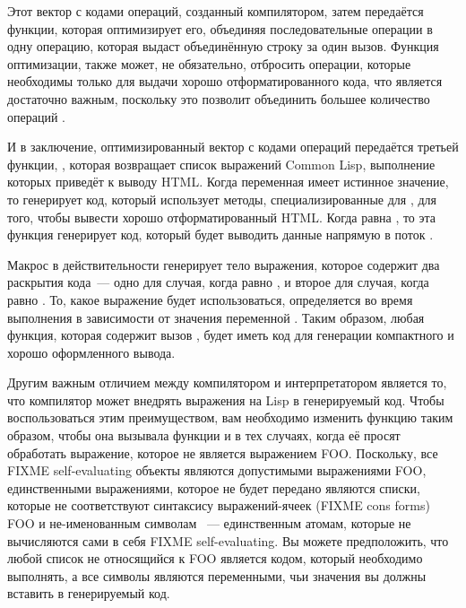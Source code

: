 Этот вектор с кодами операций, созданный компилятором, затем передаётся функции, которая
оптимизирует его, объединяя последовательные операции  в одну операцию,
которая выдаст объединённую строку за один вызов. Функция оптимизации, также может, не
обязательно, отбросить операции, которые необходимы только для выдачи хорошо
отформатированного кода, что является достаточно важным, поскольку это позволит объединить
большее количество операций .

И в заключение, оптимизированный вектор с кодами операций передаётся третьей функции,
, которая возвращает список выражений Common Lisp, выполнение которых
приведёт к выводу HTML.  Когда переменная  имеет истинное значение, то
 генерирует код, который использует методы, специализированные для
, для того, чтобы вывести хорошо отформатированный HTML. Когда
 равна , то эта функция генерирует код, который будет выводить
данные напрямую в поток .

Макрос  в действительности генерирует тело выражения, которое содержит два
раскрытия кода~--- одно для случая, когда  равно , и второе для
случая, когда  равно .  То, какое выражение будет использоваться,
определяется во время выполнения в зависимости от значения переменной .
Таким образом, любая функция, которая содержит вызов , будет иметь код для
генерации компактного и хорошо оформленного вывода.

Другим важным отличием между компилятором и интерпретатором является то, что компилятор
может внедрять выражения на Lisp в генерируемый код.  Чтобы воспользоваться этим
преимуществом, вам необходимо изменить функцию  таким образом, чтобы она
вызывала функции  и  в тех случаях, когда её просят
обработать выражение, которое не является выражением FOO. Поскольку, все FIXME
self-evaluating объекты являются допустимыми выражениями FOO, единственными выражениями,
которое не будет передано  являются списки, которые не
соответствуют синтаксису выражений-ячеек (FIXME cons forms) FOO и не-именованным символам
~--- единственным атомам, которые не вычисляются сами в себя FIXME self-evaluating.  Вы
можете предположить, что любой список не относящийся к FOO является кодом, который
необходимо выполнять, а все символы являются переменными, чьи значения вы должны вставить
в генерируемый код.

